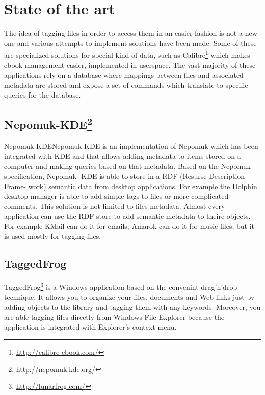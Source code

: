 


\section{State of the art}

The idea of tagging files in order to access them in an easier fashion is not
a new one and various attempts to implement solutions have been made. Some of
these are specialized solutions for special kind of data, such as Calibre\footnote{\url{http://calibre-ebook.com/}}
which makes ebook management easier, implemented in userspace. The vast majority
of these applications rely on a database where mappings between files and 
associated metadata are stored and expose a set of commands which translate
to specific queries for the database.  

\subsection[Nepomuk-KDE]{Nepomuk-KDE\footnote{\url{http://nepomuk.kde.org/}}}
Nepomuk-KDENepomuk-KDE is an implementation of Nepomuk which
has been integrated with KDE and that allows adding metadata
to items stored on a computer and making queries based on
that metadata. Based on the Nepomuk specification, Nepomuk-
KDE is able to store in a RDF (Resurse Description Frame-
work) semantic data from desktop applications. For example
the Dolphin desktop manager is able to add simple tags to files
or more complicated comments. This solution is not limited
to files metadata. Almost every application can use the RDF
store to add semantic metadata to theire objects. For example
KMail can do it for emails, Amarok can do it for music files,
but it is used mostly for tagging files.


\subsection{TaggedFrog}TaggedFrog\footnote{ \url{http://lunarfrog.com/}} is a Windows application 
based on the convenint drag'n'drop technique. It allows you to organize your files, 
documents and Web links just by adding objects to the library and tagging them with 
any keywords. Moreover, you are able tagging files directly from Windows File Explorer 
because the application is integrated with Explorer's context menu.

